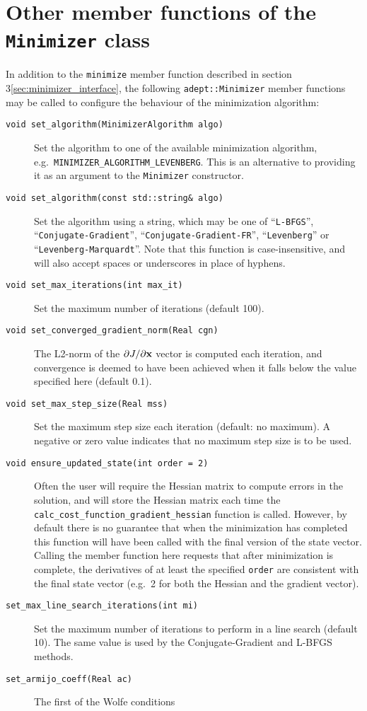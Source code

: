 \documentclass[a4,oneside]{book}
\def\codesize{\small}
\def\code#1{{\codesize\texttt{#1}}}
\def\citem#1{\item[{\codesize\texttt{#1}}]}
\begin{document}
\section{Other member functions of the \code{Minimizer} class}
\label{sec:minimizer_options}
In addition to the \code{minimize} member function described in
section 3\ref{sec:minimizer_interface}, the following
\code{adept::Minimizer} member functions may be called to configure
the behaviour of the minimization algorithm:
\begin{description}
\citem{void set\_algorithm(MinimizerAlgorithm algo)} Set the algorithm
to one of the available minimization algorithm,
e.g.\ \code{MINIMIZER\_ALGORITHM\_LEVENBERG}. This is an alternative
to providing it as an argument to the \code{Minimizer} constructor.
%
\citem{void set\_algorithm(const std::string\&\ algo)} Set the
algorithm using a string, which may be one of ``\code{L-BFGS}'',
``\code{Conjugate-Gradient}'', ``\code{Conjugate-Gradient-FR}'',
``\code{Levenberg}'' or ``\code{Levenberg-Marquardt}''.  Note that
this function is case-insensitive, and will also accept spaces or
underscores in place of hyphens.
%
\citem{void set\_max\_iterations(int max\_it)} Set the maximum number
of iterations (default 100).
%
\citem{void set\_converged\_gradient\_norm(Real cgn)} The L2-norm of
the $\partial J/\partial{\bf x}$ vector is computed each iteration,
and convergence is deemed to have been achieved when it falls below
the value specified here (default 0.1).
%
\citem{void set\_max\_step\_size(Real mss)} Set the maximum step size
each iteration (default: no maximum). A negative or zero value
indicates that no maximum step size is to be used.
%
\citem{void ensure\_updated\_state(int order = 2)} Often the user will
require the Hessian matrix to compute errors in the solution, and will
store the Hessian matrix each time the
\code{calc\_cost\_function\_gradient\_hessian} function is
called. However, by default there is no guarantee that when the
minimization has completed this function will have been called with the
final version of the state vector.  Calling the member function here
requests that after minimization is complete, the derivatives of at
least the specified \code{order} are consistent with the final state
vector (e.g.\ 2 for both the Hessian and the gradient vector).
%
\citem{set\_max\_line\_search\_iterations(int mi)} Set the maximum
number of iterations to perform in a line search (default 10). The
same value is used by the Conjugate-Gradient and L-BFGS methods.
%
\citem{set\_armijo\_coeff(Real ac)} The first of the Wolfe conditions

\end{description}
\end{document}
